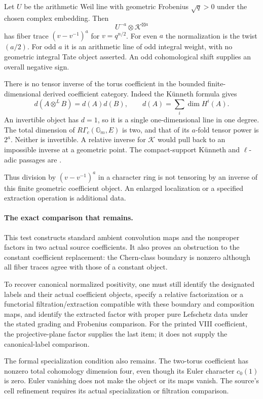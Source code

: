 Let \(U\) be the arithmetic Weil line with geometric
Frobenius \(\sqrt q>0\) under the chosen complex embedding.
Then
\[
                   U^{-a}\otimes\mathcal K^{\boxtimes a}
\]
has fiber trace \((v-v^{-1})^a\) for \(v=q^{n/2}\).
For even \(a\) the normalization is the twist \((a/2)\).
For odd \(a\) it is an arithmetic line of odd integral weight,
with no geometric integral Tate object asserted.
An odd cohomological shift supplies an overall negative sign.

There is no tensor inverse of the torus coefficient in the
bounded finite-dimensional derived coefficient category.
Indeed the K\"unneth formula gives
\[
 d(A\otimes^L B)=d(A)d(B),\qquad
 d(A)=\sum_i\dim H^i(A).
\]
An invertible object has \(d=1\), so it is a single
one-dimensional line in one degree.
The total dimension of \(R\Gamma_c(\mathbb G_m,E)\) is two,
and that of its \(a\)-fold tensor power is \(2^a\).
Neither is invertible. A relative inverse for \(\mathcal K\)
would pull back to an impossible inverse at a geometric point.
The compact-support K\"unneth and \(\ell\)-adic passages are
\cite[Theorem~22.1 and Remark~22.3(b)--(d),
pp.~135--136]{Milne}.

Thus division by \((v-v^{-1})^a\) in a character ring is
not tensoring by an inverse of this finite geometric
coefficient object. An enlarged localization or a specified
extraction operation is additional data.

\paragraph{The exact comparison that remains.}
This test constructs standard ambient convolution maps and
the nonproper factors in two actual source coefficients.
It also proves an obstruction to the constant coefficient
replacement: the Chern-class boundary is nonzero although
all fiber traces agree with those of a constant object.

To recover canonical normalized positivity, one must still
identify the designated labels and their actual coefficient
objects, specify a relative factorization or a functorial
filtration/extraction compatible with these boundary and
composition maps, and identify the extracted factor with
proper pure Lefschetz data under the stated grading and
Frobenius comparison.
For the printed VIII coefficient, the projective-plane
factor supplies the last item; it does not supply the
canonical-label comparison.

The formal specialization condition also remains.
The two-torus coefficient has nonzero total cohomology
dimension four, even though its Euler character
\(c_0(1)\) is zero. Euler vanishing does not make the
object or its maps vanish. The source's cell refinement
requires its actual specialization or filtration comparison.

